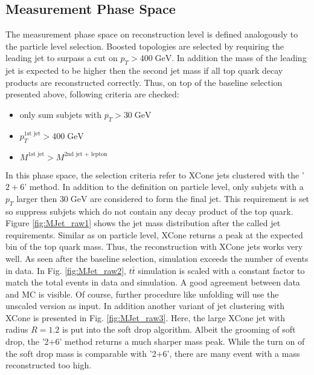 \subsection{Measurement Phase Space}
\label{sec:FinalSel}
	The measurement phase space on reconstruction level is defined analogously to the particle level selection. Boosted topologies are selected by requiring the leading jet to surpass a cut on $p_T > 400\;\text{GeV}$. In addition the mass of the leading jet is expected to be higher then the second jet mass if all top quark decay products are reconstructed correctly. Thus, on top of the baseline selection presented above, following criteria are checked:
	\begin{itemize}
	\item only sum subjets with $p_T > 30\;\text{GeV}$ 
	\item $p_T^{\text{1st jet}} > 400\;\text{GeV}$ 
	\item $M^{\text{1st jet}} > M^{\text{2nd jet + lepton}}$
	\end{itemize}
	In this phase space, the selection criteria refer to XCone jets clustered with the '$2+6$' method.	In addition to the definition on particle level, only subjets with a $p_T$ larger then $30\;\text{GeV}$ are considered to form the final jet. This requirement is set so suppress subjets which do not contain any decay product of the top quark. Figure \ref{fig:MJet_raw1} shows the jet mass distribution after the called jet requirements. Similar as on particle level, XCone returns a peak at the expected bin of the top quark mass. Thus, the reconstruction with XCone jets works very well. As seen after the baseline selection, simulation exceeds the number of events in data. In Fig. \ref{fig:MJet_raw2}, $t\bar{t}$ simulation is scaled with a constant factor to match the total events in data and simulation. A good agreement between data and MC is visible. Of course, further procedure like unfolding will use the unscaled version as input. In addition another variant of jet clustering with XCone is presented in Fig. \ref{fig:MJet_raw3}. Here, the large XCone jet with radius $R=1.2$ is put into the soft drop algorithm. Albeit the grooming of soft drop, the '2+6' method returns a much sharper mass peak. While the turn on of the soft drop mass is comparable with '2+6', there are many event with a mass reconstructed too high.
